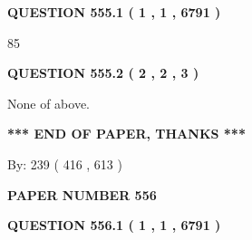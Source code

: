\documentclass[12pt]{article}
\begin{document}
 
 
 
   
   
  
\vspace{0.2in}
  
{\textbf{\Large{QUESTION
555.1 
 ( 1 , 1 , 6791 )
}}}
  
  
 
 
\noindent{}

85
 
 
  
\vspace{0.2in}
  
{\textbf{\Large{QUESTION
555.2 
 ( 2 , 2 , 3 )
}}}
  
  
 
 
\noindent{}
 
 
 None of above.
 
 
 
 
   
   
 \vspace{0.2in}
 
   
   
   
   
\vspace{1.0in} 
{\textbf{\large{ *** END OF PAPER, THANKS *** }}} 
   
   
\hspace{1.0in} By: 
 239 ( 416 ,  613 )
   
   
   
   
\newpage 
\setcounter{page}{ 
   556001 } 
   
   
   
   
 {\textbf{ \Large{ PAPER NUMBER  556  }}}
   
   
\vspace{0.2in}
   
   
   
   
   
   
 \vspace{0.2in}
 
 
 
 
   
   
  
\vspace{0.2in}
  
{\textbf{\Large{QUESTION
556.1 
 ( 1 , 1 , 6791 )
}}}
  
\end{document}
